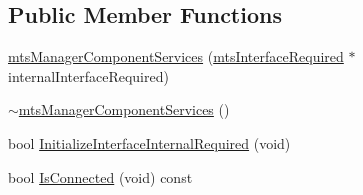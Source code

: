 \subsection*{Public Member Functions}
\begin{DoxyCompactItemize}
\item 
\hyperlink{classmts_manager_component_services_ad96b17a0c6a447b45eabb09dba27ff3b}{mts\+Manager\+Component\+Services} (\hyperlink{classmts_interface_required}{mts\+Interface\+Required} $\ast$internal\+Interface\+Required)
\item 
\hyperlink{classmts_manager_component_services_aa42293f51a7a9f6c40bc0cadc2f3c4cb}{$\sim$mts\+Manager\+Component\+Services} ()
\item 
bool \hyperlink{classmts_manager_component_services_a91a14c8b3c7093aad113a99d8648c58e}{Initialize\+Interface\+Internal\+Required} (void)
\item 
bool \hyperlink{classmts_manager_component_services_acf4e608081b9d7827043c7f0826b3dc3}{Is\+Connected} (void) const 
\end{DoxyCompactItemize}
{\bf }\par

